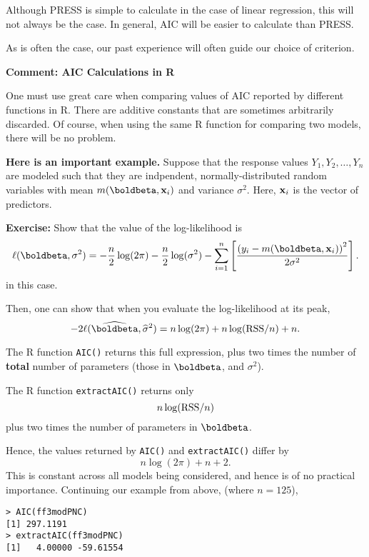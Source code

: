 \documentclass{report}
\begin{document}
Although PRESS is simple to calculate in the case of linear
regression, this will not always be the case. In general,
AIC will be easier to calculate than PRESS.

As is often the case, our past experience will often guide our
choice of criterion.

\newpage
\makerule
{\bf \LARGE Comment: AIC Calculations in R}

One must use great care when
comparing values of AIC reported by different functions in R. There are
additive constants that are sometimes arbitrarily discarded.
Of course, when using the same R function for comparing
two models, there will be no problem.

{\bf Here is an important example.}
Suppose that the response values $Y_1, Y_2, \ldots, Y_n$ are
modeled such that they are indpendent, normally-distributed random variables 
with mean $m(\boldbeta, {\bf x}_i)$ and variance $\sigma^2$. Here, ${\bf x}_i$
is the vector of predictors. 

\textcolor{qcol}{{\bf Exercise:}
Show that the value of the log-likelihood is
\[
   \ell(\boldbeta, \sigma^2) = -\frac{n}{2} \log(2\pi) - \frac{n}{2} \log(\sigma^2) - \sum_{i=1}^n \left[\frac{\left(y_i - m\!\left(\boldbeta, {\bf x}_i\right)\right)^2}{2\sigma^2}\right].
\]
in this case.
}


\newpage
Then, one can show that when you evaluate the log-likelihood at its peak,
\[
   -2 \ell(\widehat{\boldbeta}, \widehat \sigma^2) = n \log(2\pi) + n \log({\rm RSS}/n) + n.
\]

The R function {\tt AIC()} returns this full expression, plus two times the number of
{\bf total} number of parameters (those in $\boldbeta$, and $\sigma^2$).

The R function {\tt extractAIC()} returns only
\[
   n \log({\rm RSS}/n)
\]
plus two times the number of parameters in $\boldbeta$.

Hence, the values returned by {\tt AIC()} and {\tt extractAIC()} differ by
\[
   n \log(2\pi) + n + 2.
\]
This is constant across all models being considered,
and hence is of no practical importance.
Continuing our example from above, (where $n=125$),

\vspace{-.5in}
\begin{verbatim}
> AIC(ff3modPNC)
[1] 297.1191
> extractAIC(ff3modPNC)
[1]   4.00000 -59.61554
\end{verbatim}
\end{document}
